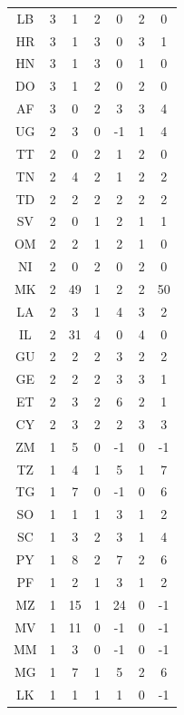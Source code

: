 {\begin{table}[ht]
\begin{adjustbox}{width=\textwidth}
\begin{tabular}{c|cc|cc|cc}
                LB & 3 & 1 & 2 & 0 & 2 & 0\\
                HR & 3 & 1 & 3 & 0 & 3 & 1\\
                HN & 3 & 1 & 3 & 0 & 1 & 0\\
                DO & 3 & 1 & 2 & 0 & 2 & 0\\
                AF & 3 & 0 & 2 & 3 & 3 & 4\\
                UG & 2 & 3 & 0 & -1 & 1 & 4\\
                TT & 2 & 0 & 2 & 1 & 2 & 0\\
                TN & 2 & 4 & 2 & 1 & 2 & 2\\
                TD & 2 & 2 & 2 & 2 & 2 & 2\\
                SV & 2 & 0 & 1 & 2 & 1 & 1\\
                OM & 2 & 2 & 1 & 2 & 1 & 0\\
                NI & 2 & 0 & 2 & 0 & 2 & 0\\
                MK & 2 & 49 & 1 & 2 & 2 & 50\\
                LA & 2 & 3 & 1 & 4 & 3 & 2\\
                IL & 2 & 31 & 4 & 0 & 4 & 0\\
                GU & 2 & 2 & 2 & 3 & 2 & 2\\
                GE & 2 & 2 & 2 & 3 & 3 & 1\\
                ET & 2 & 3 & 2 & 6 & 2 & 1\\
                CY & 2 & 3 & 2 & 2 & 3 & 3\\
                ZM & 1 & 5 & 0 & -1 & 0 & -1\\
                TZ & 1 & 4 & 1 & 5 & 1 & 7\\
                TG & 1 & 7 & 0 & -1 & 0 & 6\\
                SO & 1 & 1 & 1 & 3 & 1 & 2\\
                SC & 1 & 3 & 2 & 3 & 1 & 4\\
                PY & 1 & 8 & 2 & 7 & 2 & 6\\
                PF & 1 & 2 & 1 & 3 & 1 & 2\\
                MZ & 1 & 15 & 1 & 24 & 0 & -1\\
                MV & 1 & 11 & 0 & -1 & 0 & -1\\
                MM & 1 & 3 & 0 & -1 & 0 & -1\\
                MG & 1 & 7 & 1 & 5 & 2 & 6\\
                LK & 1 & 1 & 1 & 1 & 0 & -1\\

\end{tabular}
\end{adjustbox}
\end{table}}
